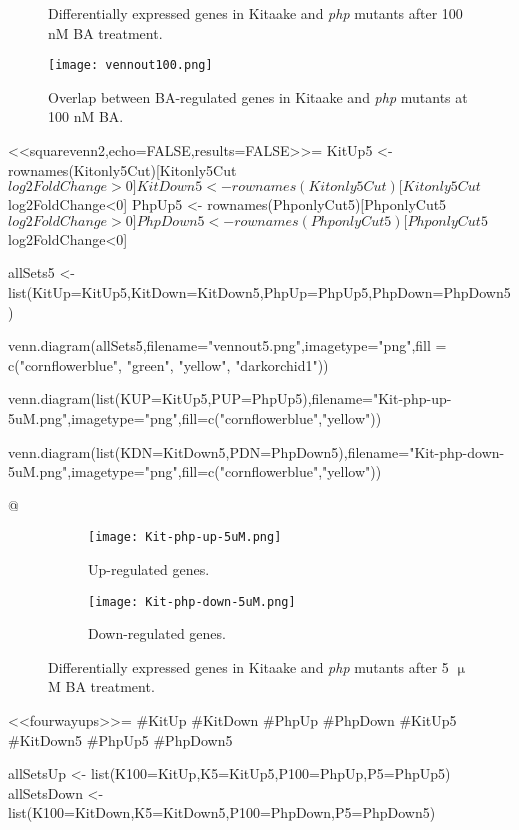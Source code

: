 \documentclass{article}
\begin{document}
{{{\begin{figure}
	\caption{Differentially expressed genes in Kitaake and \textit{php} mutants after 100 nM BA treatment.}
	\label{fig:phpkitup100}
\end{figure}




\begin{figure}
	\centering{}
	\texttt{[image: vennout100.png]}
	\caption{Overlap between BA-regulated genes in Kitaake and \textit{php} mutants at 100 nM BA.}
	\label{fig:squarevenn100}
\end{figure}

<<squarevenn2,echo=FALSE,results=FALSE>>=
KitUp5 <- rownames(Kitonly5Cut)[Kitonly5Cut$log2FoldChange>0]
KitDown5 <- rownames(Kitonly5Cut)[Kitonly5Cut$log2FoldChange<0]
PhpUp5 <- rownames(PhponlyCut5)[PhponlyCut5$log2FoldChange>0]
PhpDown5 <- rownames(PhponlyCut5)[PhponlyCut5$log2FoldChange<0]

allSets5 <- list(KitUp=KitUp5,KitDown=KitDown5,PhpUp=PhpUp5,PhpDown=PhpDown5)

venn.diagram(allSets5,filename="vennout5.png",imagetype="png",fill = c("cornflowerblue", "green", "yellow", "darkorchid1"))



venn.diagram(list(KUP=KitUp5,PUP=PhpUp5),filename="Kit-php-up-5uM.png",imagetype="png",fill=c("cornflowerblue","yellow"))

venn.diagram(list(KDN=KitDown5,PDN=PhpDown5),filename="Kit-php-down-5uM.png",imagetype="png",fill=c("cornflowerblue","yellow"))


@

\begin{figure}
	\begin{subfigure}{0.49\linewidth}
		\texttt{[image: Kit-php-up-5uM.png]}
		\caption{Up-regulated genes.}
		\label{fig:phpkitup5A}
	\end{subfigure}
	\begin{subfigure}{0.49\linewidth}
		\texttt{[image: Kit-php-down-5uM.png]}
		\caption{Down-regulated genes.}
		\label{fig:phpkitup5B}	
	\end{subfigure}
	
	\caption{Differentially expressed genes in Kitaake and \textit{php} mutants after 5 $\upmu$M BA treatment.}
	\label{fig:phpkitup5}
\end{figure}


<<fourwayups>>=
#KitUp
#KitDown
#PhpUp
#PhpDown
#KitUp5
#KitDown5
#PhpUp5
#PhpDown5

allSetsUp <- list(K100=KitUp,K5=KitUp5,P100=PhpUp,P5=PhpUp5)
allSetsDown <- list(K100=KitDown,K5=KitDown5,P100=PhpDown,P5=PhpDown5)


}}}
\end{document}
